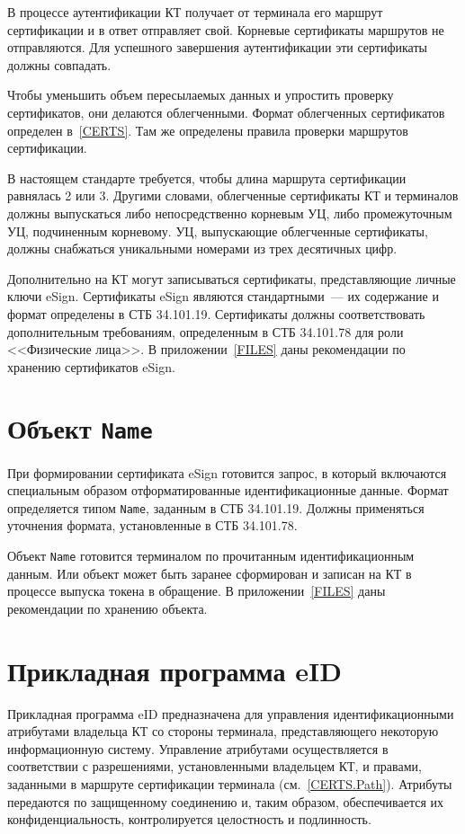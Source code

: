
В процессе аутентификации КТ получает от терминала его маршрут сертификации
и в ответ отправляет свой. Корневые сертификаты маршрутов не отправляются. 
Для успешного завершения аутентификации эти сертификаты должны совпадать.

Чтобы уменьшить объем пересылаемых данных и упростить проверку сертификатов, 
они делаются облегченными. Формат облегченных сертификатов определен 
в~\ref{CERTS}. Там же определены правила проверки маршрутов сертификации.

В настоящем стандарте требуется, чтобы длина маршрута сертификации 
равнялась 2 или 3. Другими словами, облегченные сертификаты КТ и терминалов 
должны выпускаться либо непосредственно корневым УЦ, либо промежуточным УЦ, 
подчиненным корневому. УЦ, выпускающие облегченные сертификаты, должны 
снабжаться уникальными номерами из трех десятичных цифр. 

Дополнительно на КТ могут записываться сертификаты, представляющие личные ключи 
eSign. Сертификаты eSign являются стандартными~--- их содержание и формат 
определены в СТБ 34.101.19. Сертификаты должны соответствовать дополнительным 
требованиям, определенным в СТБ 34.101.78 для роли <<Физические лица>>. 
%
В приложении~\ref{FILES} даны рекомендации по хранению сертификатов eSign.

\section{Объект \texttt{Name}}\label{OBJ.Name}

При формировании сертификата eSign готовится запрос, в который включаются
специальным образом отформатированные идентификационные данные. Формат
определяется типом \texttt{Name}, заданным в СТБ 34.101.19. Должны применяться
уточнения формата, установленные в СТБ 34.101.78.

Объект \texttt{Name} готовится терминалом по прочитанным идентификационным данным.
%
Или объект может быть заранее сформирован и записан на КТ в процессе выпуска 
токена в обращение. В приложении~\ref{FILES} даны рекомендации по хранению 
объекта.

\section{Прикладная программа eID}\label{OBJ.eID}

Прикладная программа eID предназначена для управления идентификационными
атрибутами владельца КТ со стороны терминала, представляющего некоторую
информационную систему.
%
Управление атрибутами осуществляется в соответствии с разрешениями,
установленными владельцем КТ, и правами, заданными в маршруте сертификации
терминала (см.~\ref{CERTS.Path}).
%
Атрибуты передаются по защищенному соединению и, таким образом, обеспечивается 
их конфиденциальность, контролируется целостность и подлинность. 

